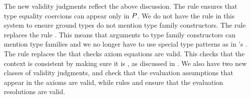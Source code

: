 \documentclass[format=acmsmall,manuscript,review,screen,nonacm,margin=1in,11pt]{acmart}
\begin{document}
The new validity judgments reflect the above discussion. The rule  ensures
that type equality coercions can appear only in $P$. We do not have the rule 
in this system to ensure ground types do not mention type family constructors.
The rule  replaces the rule . This means that arguments to type family
constructors can mention type families and we no longer have to use special type patterns as in \CLTF's .
The rule  replaces the  that checks axiom equations are valid. This checks that the context
is consistent by making sure it is \Good, as discussed in .
We also have two new classes of validity judgments,  and  check
that the evaluation assumptions that appear in the axioms are valid, while rules 
and  ensure that the evaluation resolutions are valid.

\newcommand\ResNil{
  \ib{\irule[\trule{v-rese}]
    {\ValidCtx \TEnv};
    {\ResTyping \TEnv \empt \empt}
  }
}
\newcommand\ResCons{
  \ib{\irule[\trule{v-resc}]
    {\ValidType \TEnv \sigma}
    {\CoTyping \TEnv \Co {\FamCtrs(\many\tau)\teq\sigma}}
    {\ResTyping \TEnv {\many q} {\many\chi[\alpha/\sigma]}};
    {\ResTyping \TEnv {(\sigma|\Co), \many q} {(\alpha|c\co\FamCtrs(\many\tau)\teq\alpha), \many \chi}}
  }
}

\newcommand\ValidQGndContextAxiom{
  \ib{\irule[\trule{v-qgax}]
    {\substack {\ValidGCtx\GEnv\\
        \fresh \Axiom\GEnv}}
    {\substack {{\many{\ValidType {\GEnv;\many\alpha_i,\TV{\many\chi}} {\tau_{0i}}}}\\
        {\many{\ValidProp{\GEnv;\empt}{\Forall{\many\alpha}{\FamCtrs(\many\tau)\teq\sigma}}}}}}
    {\substack {{\many{\ValidType {\GEnv;\many\alpha_i} {\many\tau_i}}}\\
      {\ValidAssmp {\GEnv;\many\alpha_i} {\many\chi_i}}}}
    {\FamCtrs\co n \in \GEnv};
    {\ValidGCtx{\GEnv,\Axiom\co\many{\Forall{\many\alpha~\many\chi}{\FamCtrs(\many\tau_i)\teq\tau_{0i}}}^{i<k}}}
  }
}

\newcommand\ValidNilAssmp{
  \ib{\irule[\trule{v-assmn}];
    {\ValidAssmp \TEnv \empt}}
}

\newcommand\ValidConsAssmp{
  \ib{\irule[\trule{v-assmc}]
    {\FamCtrs\co n \in \GEnv}
    {\many{\ValidType {\GEnv;\VEnv} {\tau_i}}^{i<n}}
    {\ValidAssmp {\GEnv;\VEnv,\alpha} {\many\chi}};
    {\ValidAssmp {\GEnv;\VEnv} {(\alpha|c\co\FamCtrs(\many\tau)\teq\alpha),\many\chi}}}
}
\newcommand\ValidQType{
  \ib{\irule[\trule{v-qty}]
    {\ValidProp \TEnv \Preds}
    {\ValidType \TEnv \tau};
    {\ValidType \TEnv {\Preds\then\tau}}}
}
\newcommand\ValidQTyFam{
  \ib{\irule[\trule{v-qtfp}]
    {\FamCtrs\co n \in \GEnv}
    {\many{\ValidType {\GEnv;\TEnv} {\tau_i}}^{i<n}}
    {\ValidType {\GEnv;\VEnv} \sigma};
    {\ValidProp {\GEnv;\VEnv} {\FamCtrs(\many\tau)\teq\sigma}}}
}
\end{document}
